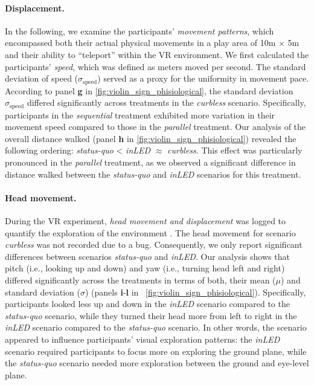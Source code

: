 \paragraph{Displacement.}
In the following, we examine the participants' \emph{movement patterns}, which encompassed both their actual physical movements in a play area of 10m $\times$ 5m and their ability to ``teleport'' within the VR environment. We first calculated the participants' \emph{speed}, which was defined as meters moved per second. The standard deviation of speed ($\sigma_{\text{speed}}$) served as a proxy for the uniformity in movement pace. According to panel \textbf{g} in \autoref{fig:violin_sign_phisiological}, the standard deviation $\sigma_{\text{speed}}$ differed significantly across treatments in the \emph{curbless} scenario. Specifically, participants in the \emph{sequential} treatment exhibited more variation in their movement speed compared to those in the \emph{parallel} treatment.
Our analysis of the overall distance walked (panel \textbf{h} in \autoref{fig:violin_sign_phisiological}) revealed the following ordering: \emph{status-quo} < \emph{inLED} $\approx$ \emph{curbless}. This effect was particularly pronounced in the \emph{parallel} treatment, as we observed a significant difference in distance walked between the \emph{status-quo} and \emph{inLED} scenarios for this treatment.

\paragraph{Head movement.}
During the VR experiment, \emph{head movement and displacement} was logged to quantify the exploration of the environment \cite{Bischof2020, VanHelvoort2020, Hu2017}. 
The head movement for scenario \emph{curbless} was not recorded due to a bug. Consequently, we only report significant differences between scenarios \emph{status-quo} and \emph{inLED}.
Our analysis shows that pitch (i.e., looking up and down) and yaw (i.e., turning head left and right) differed significantly across the treatments in terms of both, their mean ($\mu$) and standard deviation ($\sigma$) (panels \textbf{i}-\textbf{l} in ~\autoref{fig:violin_sign_phisiological}). Specifically, participants looked less up and down in the \emph{inLED} scenario compared to the \emph{status-quo} scenario, while they turned their head more from left to right in the \emph{inLED} scenario compared to the \emph{status-quo} scenario.
In other words, the scenario appeared to influence participants' visual exploration patterns: the \emph{inLED} scenario required participants to focus more on exploring the ground plane, while the \emph{status-quo} scenario needed more exploration between the ground and eye-level plane.


